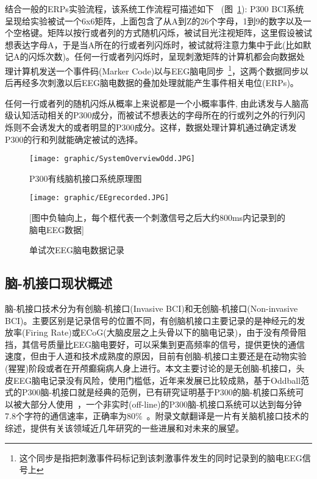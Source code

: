 结合一般的ERPs实验流程，该系统工作流程可描述如下~\cite{LuckAugust12005} \cite{Donchin2000}(图~\ref{WiredBCI}): P300 BCI系统呈现给实验被试一个6x6矩阵，上面包含了从A到Z的26个字母，1到9的数字以及一个空格键。矩阵以按行或者列的方式随机闪烁，被试目光注视矩阵，这里假设被试想表达字母A，于是当A所在的行或者列闪烁时，被试就将注意力集中于此(比如默记A的闪烁次数)。任何一行或者列闪烁时，呈现刺激矩阵的计算机都会向数据处理计算机发送一个事件码(Marker Code)以与EEG脑电同步~\footnote{这个同步是指把刺激事件码标记到该刺激事件发生的同时记录到的脑电EEG信号上}，这两个数据同步以后再经多次刺激以后EEG脑电数据的叠加处理就能产生事件相关电位(ERPs)。

任何一行或者列的随机闪烁从概率上来说都是一个小概率事件, 由此诱发与人脑高级认知活动相关的P300成分，而被试不想表达的字母所在的行或列之外的行列闪烁则不会诱发大的或者明显的P300成分。这样，数据处理计算机通过确定诱发P300的行和列就能确定被试的选择。


\begin{figure}[!hbp]
\begin{center}
\texttt{[image: graphic/SystemOverviewOdd.JPG]}
\caption{P300有线脑机接口系统原理图 \label{WiredBCI}}
\end{center}
\end{figure}

\begin{figure}[!hbp]
\begin{center}
\texttt{[image: graphic/EEgrecorded.JPG]}
\caption{单试次EEG脑电数据记录 \label{EEGSingleTrial}}
[图中负轴向上，每个框代表一个刺激信号之后大约800ms内记录到的脑电EEG数据]
\end{center}
\end{figure}

\subsection{脑-机接口现状概述}

	脑-机接口技术分为有创脑-机接口(Invasive BCI)和无创脑-机接口(Non-invasive BCI)。主要区别是记录信号的位置不同，有创脑机接口主要记录的是神经元的发放率(Firing Rate)或ECoG(大脑皮层之上头骨以下的脑电记录)，由于没有颅骨阻挡，其信号质量比EEG脑电要好，可以采集到更高频率的信号，提供更快的通信速度，但由于人道和技术成熟度的原因，目前有创脑-机接口主要还是在动物实验(猩猩)阶段或者在开颅癫痫病人身上进行。本文主要讨论的是无创脑-机接口，头皮EEG脑电记录没有风险，使用门槛低，近年来发展已比较成熟，基于Oddball范式的P300脑-机接口就是经典的范例，已有研究证明基于P300的脑-机接口系统可以被大部分人使用~\cite{FARWELL1988}，一个非实时(off-line)的P300脑-机接口系统可以达到每分钟7.8个字符的通信速率，正确率为$80\% $~\cite{Donchin2000}。附录文献翻译是一片有关脑机接口技术的综述，提供有关该领域近几年研究的一些进展和对未来的展望。

